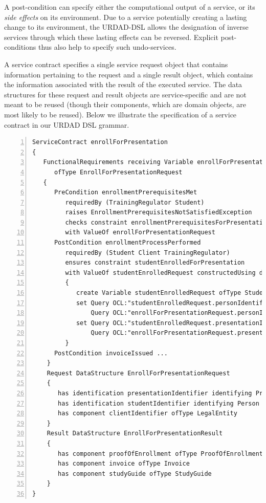 A post-condition can specify either the computational output of a service, or its \emph{side effects} on its environment. Due to a service potentially creating a lasting change to its environment, the URDAD-DSL allows the designation of inverse services through which these lasting effects can be reversed. Explicit post-conditions thus also help to specify such undo-services.

A service contract specifies a single service request object that contains information pertaining to the request and a single result object, which contains the information associated with the result of the executed service. The data structures for these request and result objects are service-specific and are not meant to be reused (though their components, which are domain objects, are most likely to be reused). Below we illustrate the specification of a service contract in our URDAD DSL grammar.
\tiny \begin{lstlisting}[numbers=left,escapechar=|]
ServiceContract enrollForPresentation
{
   FunctionalRequirements receiving Variable enrollForPresentationRequest 
      ofType EnrollForPresentationRequest
   {
      PreCondition enrollmentPrerequisitesMet
         requiredBy (TrainingRegulator Student) 
         raises EnrollmentPrerequisitesNotSatisfiedException
         checks constraint enrollmentPrerequisitesForPresentationMet
         with ValueOf enrollForPresentationRequest
      PostCondition enrollmentProcessPerformed
         requiredBy (Student Client TrainingRegulator)
         ensures constraint studentEnrolledForPresentation 
         with ValueOf studentEnrolledRequest constructedUsing doSequential
         {
            create Variable studentEnrolledRequest ofType StudentEnrolledRequest
            set Query OCL:"studentEnrolledRequest.personIdentifier" equalTo
                Query OCL:"enrollForPresentationRequest.personIdentifier"                            
            set Query OCL:"studentEnrolledRequest.presentationIdentifier" equalTo
                Query OCL:"enrollForPresentationRequest.presentationIdentifier"                            
         }  
      PostCondition invoiceIssued ...
    }            
    Request DataStructure EnrollForPresentationRequest 
    {
       has identification presentationIdentifier identifying Presentation
       has identification studentIdentifier identifying Person
       has component clientIdentifier ofType LegalEntity         
    }
    Result DataStructure EnrollForPresentationResult 
    {
       has component proofOfEnrollment ofType ProofOfEnrollment
       has component invoice ofType Invoice
       has component studyGuide ofType StudyGuide
    }
}
\end{lstlisting}\normalsize

